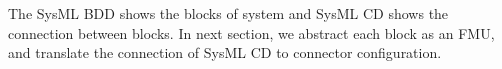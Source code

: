 \begin{figure}[htbp]
\end{figure}
The SysML BDD shows the blocks of system and SysML CD shows the connection between blocks. In next section, we abstract each block as an FMU, and translate the connection of SysML CD to connector configuration.

